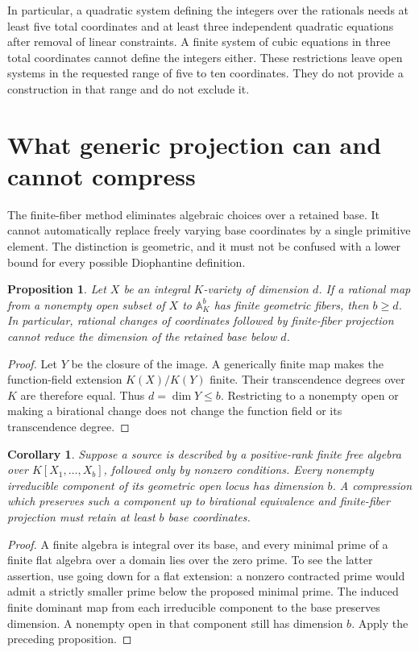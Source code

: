 \documentclass[11pt]{article}
\newtheorem{proposition}[theorem]{Proposition}
\newtheorem{corollary}[theorem]{Corollary}
\theoremstyle{definition}
\begin{document}
In particular, a quadratic system defining the integers over the
rationals needs at least five total coordinates and at least three
independent quadratic equations after removal of linear constraints.
A finite system of cubic equations in three total coordinates cannot
define the integers either.  These restrictions leave open systems in
the requested range of five to ten coordinates.  They do not provide
a construction in that range and do not exclude it.


\section{What generic projection can and cannot compress}
\label{p3sys:projection-limits}

The finite-fiber method eliminates algebraic choices over a retained
base.  It cannot automatically replace freely varying base coordinates
by a single primitive element.  The distinction is geometric, and
it must not be confused with a lower bound for every possible
Diophantine definition.

\begin{proposition}\label{p3sys:finite-projection-dimension}
Let $X$ be an integral $K$-variety of dimension $d$.  If a rational
map from a nonempty open subset of $X$ to $\mathbb A^b_K$ has
finite geometric fibers, then $b\ge d$.
In particular, rational changes of coordinates followed by finite-fiber
projection cannot reduce the dimension of the retained base below $d$.
\end{proposition}
\begin{proof}
Let $Y$ be the closure of the image.  A generically finite map makes
the function-field extension $K(X)/K(Y)$ finite.  Their transcendence
degrees over $K$ are therefore equal.  Thus
$d=\dim Y\le b$.  Restricting to a nonempty open or making a
birational change does not change the function field or its
transcendence degree.
\end{proof}

\begin{corollary}\label{p3sys:monic-base-barrier}
Suppose a source is described by a positive-rank finite free algebra
over $K[X_1,\ldots,X_b]$, followed only by nonzero conditions.
Every nonempty irreducible component of its geometric open locus
has dimension $b$.  A compression which preserves such a component
up to birational equivalence and finite-fiber projection must retain
at least $b$ base coordinates.
\end{corollary}
\begin{proof}
A finite algebra is integral over its base, and every minimal
prime of a finite flat algebra over a domain lies over the zero
prime.  To see the latter assertion, use going down for a flat
extension: a nonzero contracted prime would admit a strictly
smaller prime below the proposed minimal prime.  The induced
finite dominant map from each irreducible component to the
base preserves dimension.  A nonempty open in that component
still has dimension $b$.  Apply the preceding proposition.
\end{proof}
\end{document}
